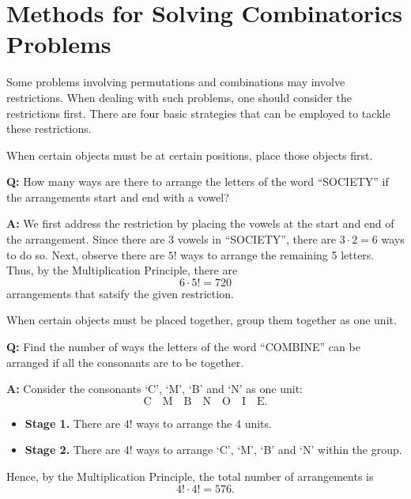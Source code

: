 \section{Methods for Solving Combinatorics Problems}

Some problems involving permutations and combinations may involve restrictions. When dealing with such problems, one should consider the restrictions first. There are four basic strategies that can be employed to tackle these restrictions.

\begin{recipe}
    When certain objects must be at certain positions, place those objects first.
\end{recipe}

\begin{example}
    \phantom{.}
    
    \textbf{Q:} How many ways are there to arrange the letters of the word ``SOCIETY'' if the arrangements start and end with a vowel?
    
    \textbf{A:} We first address the restriction by placing the vowels at the start and end of the arrangement. Since there are 3 vowels in ``SOCIETY'', there are $3 \cdot 2 = 6$ ways to do so. Next, observe there are $5!$ ways to arrange the remaining 5 letters. Thus, by the Multiplication Principle, there are \[6 \cdot 5! = 720\] arrangements that satsify the given restriction.
\end{example}

\begin{recipe}
    When certain objects must be placed together, group them together as one unit.
\end{recipe}

\begin{example}
    \phantom{.}

    \textbf{Q:} Find the number of ways the letters of the word ``COMBINE'' can be arranged if all the consonants are to be together.

    \textbf{A:} Consider the consonants `C', `M', `B' and `N' as one unit: \[\boxed{\text{C} \quad \text{M} \quad \text{B} \quad \text{N}} \quad \boxed{\text{O}} \quad \boxed{\text{I}} \quad \boxed{\text{E}}.\]
    \begin{itemize}
        \item \textbf{Stage 1.} There are $4!$ ways to arrange the 4 units.
        \item \textbf{Stage 2.} There are $4!$ ways to arrange `C', `M', `B' and `N' within the group.
    \end{itemize}
    Hence, by the Multiplication Principle, the total number of arrangements is \[4! \cdot 4! = 576.\]
\end{example}

